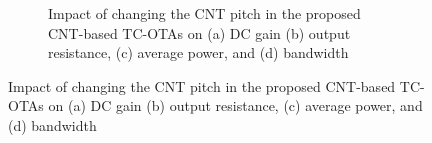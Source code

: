 
\begin{figure}[htbp]
  \centering
  \begin{subfigure}[b]{0.48\linewidth}
    \centering
  \end{subfigure}
  \hfill
  \begin{subfigure}[b]{0.48\linewidth}
    \centering
    \caption{Impact of changing the CNT pitch in the proposed CNT-based TC-OTAs on (a) DC gain (b) output resistance, (c) average power, and (d) bandwidth}

  \end{subfigure}
  \caption{Impact of changing the CNT pitch in the proposed CNT-based TC-OTAs on (a) DC gain (b) output resistance, (c) average power, and (d) bandwidth}

  \label{fig:group_2ewis}
\end{figure}
